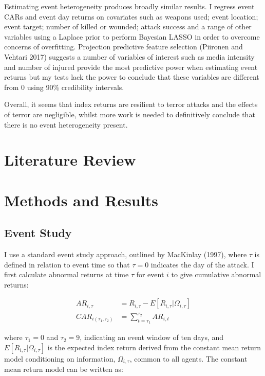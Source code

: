 \documentclass[]{AEA}
\begin{document}
Estimating event heterogeneity produces broadly similar results. I
regress event CARs and event day returns on covariates such as weapons
used; event location; event target; number of killed or wounded; attack
success and a range of other variables using a Laplace prior to perform
Bayesian LASSO in order to overcome concerns of overfitting. Projection
predictive feature selection (Piironen and Vehtari 2017) suggests a
number of variables of interest such as media intensity and number of
injured provide the most predictive power when estimating event returns
but my tests lack the power to conclude that these variables are
different from 0 using 90\% credibility intervals.

Overall, it seems that index returns are resilient to terror attacks and
the effects of terror are negligible, whilst more work is needed to
definitively conclude that there is no event heterogeneity present.

\section{Literature Review}

\section{Methods and Results}\subsection{Event Study}

I use a standard event study approach, outlined by MacKinlay (1997),
where \(\tau\) is defined in relation to event time so that \(\tau = 0\)
indicates the day of the attack. I first calculate abnormal returns at
time \(\tau\) for event \(i\) to give cumulative abnormal returns:

\[\begin{aligned} AR_{i,\tau} &=R_{i,\tau}-E[R_{i,\tau}\vert\Omega_{i,\tau}] \\
CAR_{i(\tau_{1},\tau_{2})} &=\sum_{t=\tau_{1}}^{\tau_{2}} AR_{i,t} \end{aligned}\]

where \(\tau_1 = 0\) and \(\tau_2 = 9\), indicating an event window of
ten days, and \(E[R_{i,\tau}\vert\Omega_{i,\tau}]\) is the expected
index return derived from the constant mean return model conditioning on
information, \(\Omega_{i,\tau}\), common to all agents. The constant
mean return model can be written as:
\end{document}
